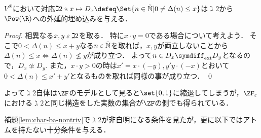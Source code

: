 \documentclass[realisability.tex]{subfiles}
\begin{document}
\begin{lemma}\label{lem:D-base-ext-inj}
 $V^{\mathcal{R}}$において対応$\gimel 2 \strni x \mapsto D_x \defeq \Set{n \in \NN | 0 \neq \Delta(n) \leq x}$は$\gimel2$から$\Pow(\R)$への外延的埋め込みを与える．
\end{lemma}
\begin{proof}
 相異なる$x, y \mathrel{\varepsilon} \gimel 2$を取る．
 特に$x \cdot y = 0$である場合について考えよう．
 そこで$0 < \Delta(n) \leq x + y$なる$n \mathrel{\varepsilon} \mathord{\tilde{\mathbb{N}}}$を取れば，$x, y$が両立しないことから$\Delta(n) \leq x \iff \Delta(n) \nleq y$が成り立つ．
 よって$n \in D_x \symdiff_{\text{ext}} D_y$となるので，$D_x \not\simeq D_y$.
 また，$x \cdot y > 0$の時は$x' = x \cdot (- y), y' y \cdot (- x)$とおいて$0 < \Delta(n) \leq x' + y'$となるものを取れば同様の事が成り立つ． \qed
\end{proof}
よって$\gimel 2$自体は$\ZF$のモデルとして見ると$\set{0, 1}$に縮退してしまうが，$\ZFe$における$\gimel 2$と同じ構造をした実数の集合が$\ZF$の側でも得られている．

補題\ref{lem:char-ba-nontriv}で$\gimel2$が非自明になる条件を見たが，更に以下ではアトムを持たない十分条件を与える．
\end{document}
